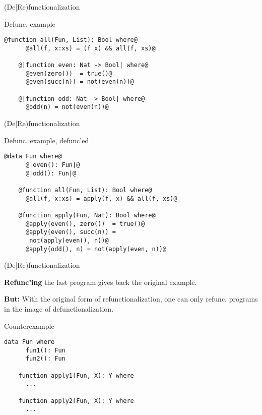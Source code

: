 \documentclass[xcolor=svgnames]{beamer}
\begin{document}
\begin{frame}[fragile]
  {(De|Re)functionalization}

  \begin{block}{Defunc. example}
    \begin{lstlisting}[style=base, gobble=4]
    @function all(Fun, List): Bool where@
      @all(f, x:xs) = (f x) && all(f, xs)@

    @|function even: Nat -> Bool| where@
      @even(zero())  = true()@
      @even(succ(n)) = not(even(n))@

    @|function odd: Nat -> Bool| where@
      @odd(n) = not(even(n))@
    \end{lstlisting}
  \end{block}
\end{frame}

\begin{frame}[fragile]
  {(De|Re)functionalization}

  \begin{block}{Defunc. example, defunc'ed}
    \begin{lstlisting}[style=base, gobble=4]
    @data Fun where@
      @|even(): Fun|@
      @|odd(): Fun|@

    @function all(Fun, List): Bool where@
      @all(f, x:xs) = apply(f, x) && all(f, xs)@

    @function apply(Fun, Nat): Bool where@
      @apply(even(), zero())  = true()@
      @apply(even(), succ(n)) = 
       not(apply(even(), n))@
      @apply(odd(), n) = not(apply(even, n))@
    \end{lstlisting}
  \end{block}
\end{frame}

\begin{frame}[fragile]
  {(De|Re)functionalization}

  \textbf{Refunc'ing} the last program gives back the original example.

  \textbf{But:} With the original form of refunctionalization, one can only refunc. programs in the image of defunctionalization.

  \begin{block}{Counterexample}
    \begin{lstlisting}[escapechar=!]
    data Fun where
      fun1(): Fun
      fun2(): Fun

    function apply1(Fun, X): Y where
      ...
    
    function apply2(Fun, X): Y where
      ...
    \end{lstlisting}
  \end{block}
\end{frame}
\end{document}
